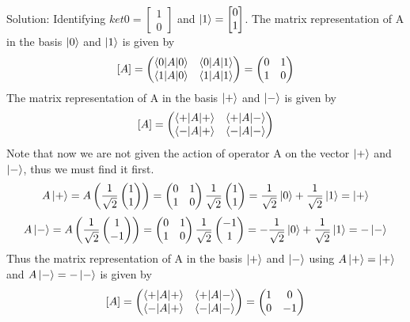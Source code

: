 \begin{example}
    Solution: Identifying $ket{0}=\begin{bmatrix} 1 \\ 0 \end{bmatrix}$ and $\ket{1}=\begin{bmatrix} 0 \\ 1 \end{bmatrix}$. The matrix representation of A in the basis $\ket{0}$ and $\ket{1}$ is given by
    \[[A]=\begin{pmatrix} \braket{0|A|0} & \braket{0|A|1} \\ \braket{1|A|0} & \braket{1|A|1} \end{pmatrix}=\begin{pmatrix} 0 & 1 \\ 1 & 0 \end{pmatrix}\]
    The matrix representation of A in the basis $\ket{+}$ and $\ket{-}$ is given by
    \[[A]=\begin{pmatrix} \braket{+|A|+} & \braket{+|A|-} \\ \braket{-|A|+} & \braket{-|A|-} \end{pmatrix}\]
    Note that now we are not given the action of operator A on the vector $\ket{+}$ and $\ket{-}$, thus we must find it first.
    \[A\ket{+}=A\left(\frac{1}{\sqrt{2}}\begin{pmatrix} 1 \\ 1 \end{pmatrix}\right)=\begin{pmatrix} 0 & 1 \\ 1 & 0 \end{pmatrix}\frac{1}{\sqrt{2}}\begin{pmatrix} 1 \\ 1 \end{pmatrix}=\frac{1}{\sqrt{2}}\ket{0}+\frac{1}{\sqrt{2}}\ket{1}=\ket{+}\]
    \[A\ket{-}=A\left(\frac{1}{\sqrt{2}}\begin{pmatrix} 1 \\ -1 \end{pmatrix}\right)=\begin{pmatrix} 0 & 1 \\ 1 & 0 \end{pmatrix}\frac{1}{\sqrt{2}}\begin{pmatrix} -1 \\ 1 \end{pmatrix}=-\frac{1}{\sqrt{2}}\ket{0}+\frac{1}{\sqrt{2}}\ket{1}=-\ket{-}\]
    Thus the matrix representation of A in the basis $\ket{+}$ and $\ket{-}$ using $A\ket{+}=\ket{+}$ and $A\ket{-}=-\ket{-}$ is given by
    \[[A]=\begin{pmatrix} \braket{+|A|+} & \braket{+|A|-} \\ \braket{-|A|+} & \braket{-|A|-} \end{pmatrix}=\begin{pmatrix} 1 & 0 \\ 0 & -1 \end{pmatrix}\]
\end{example}

